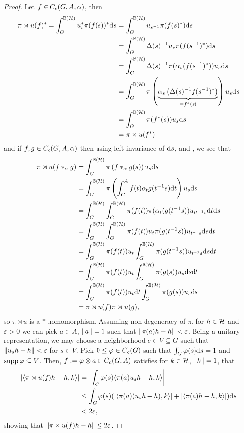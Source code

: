 \begin{proof}
Let $f \in C_c(G,A,\alpha)$, then
\begin{align*}
	\pi \rtimes u(f)^* = \int_G^{\mathbb{B}(\mathcal{H})}  u_s^* \pi(f(s))^* \mathrm{d} s &= \int_G^{\mathbb{B}(\mathcal{H})} u_{s^{-1}} \pi(f(s)^*) \mathrm{d} s\\
	&= \int_G^{\mathbb{B}(\mathcal{H})} \Delta(s)^{-1} u_{s} \pi(f(s^{-1})^*) \mathrm{d} s \\
	&= \int_G^{\mathbb{B}(\mathcal{H})} \Delta(s)^{-1} \pi(\alpha_s(f(s^{-1})^*)) u_s \mathrm{d} s\\
	&= \int_G^{\mathbb{B}(\mathcal{H})} \pi\left( \underbrace{\alpha_s\left( \Delta(s)^{-1}f(s^{-1})^* \right)}_{=f^*(s)} \right) u_s \mathrm{d} s\\
	&= \int_G^{\mathbb{B}(\mathcal{H})} \pi(f^*(s)) u_s \mathrm{d} s\\
	&= \pi \rtimes u(f^*)
\end{align*}
and if $f,g \in C_c(G,A,\alpha)$ then using left-invariance of $\mathrm{d} s$,  and , we see that
\begin{align*}
	\pi \rtimes u(f\ast_{\alpha}g) &= \int_G^{\mathbb{B}(\mathcal{H})} \pi \left( f \ast_\alpha g(s) \right)u_s \mathrm{d} s\\
	&= \int_G^{\mathbb{B}(\mathcal{H})} \pi\left( \int_G^A f(t) \alpha_t g(t^{-1}s) \mathrm{d} t \right)u_s \mathrm{d} s\\
	&= \int_G^{\mathbb{B}(\mathcal{H})}\int_G^{\mathbb{B}(\mathcal{H})} \pi(f(t)) \pi(\alpha_t(g(t^{-1}s))u_{t t^{-1}s} \mathrm{d} t \mathrm{d} s\\
	&= \int_G^{\mathbb{B}(\mathcal{H})} \int_G ^{\mathbb{B}(\mathcal{H})} \pi(f(t)) u_t \pi(g(t^{-1}s)) u_{t^{-1}s}\mathrm{d} s \mathrm{d} t\\
	&= \int_G^{\mathbb{B}(\mathcal{H})} \pi(f(t)) u_t \int_G^{\mathbb{B}(\mathcal{H})} \pi(g(t^{-1}s )) u_{t^{-1}s} \mathrm{d} s \mathrm{d} t\\
	&= \int_G ^{\mathbb{B}(\mathcal{H})} \pi(f(t)) u_t \int_G ^{\mathbb{B}(\mathcal{H})} \pi(g(s)) u_s \mathrm{d} s \mathrm{d} t\\
	&= \int_G ^{\mathbb{B}(\mathcal{H})} \pi(f(t)) u_t \mathrm{d} t \int_G ^{\mathbb{B}(\mathcal{H})} \pi(g(s)) u_s \mathrm{d} s \\
	&= \pi \rtimes u (f) \pi\rtimes u (g),
\end{align*}
so $\pi \rtimes u$ is a $*$-homomorphism. Assuming non-degeneracy of $\pi$, for $h \in \mathcal{H}$ and $\varepsilon>0$ we can pick $a \in A$, $\left\lVert a \right\rVert =1$ such that $\left\lVert \pi(a) h - h \right\rVert < \varepsilon$. Being a unitary representation, we may choose a neighborhood $e \in V \subseteq G$ such that $\left\lVert u_s h - h\right\rVert < \varepsilon$ for $s \in V$. Pick $0 \leq \varphi \in C_c(G)$ such that $\int_G \varphi(s) \mathrm{d} s = 1$ and $\operatorname{supp} \varphi \subseteq V$. Then, $f := \varphi \otimes a \in C_c(G,A)$ satisfies for $k \in \mathcal{H}$, $\left\lVert k \right\rVert = 1$, that
\begin{align*}
\left| \langle \pi \rtimes u(f)h-h,k\rangle \right| &= 	\left| \int_G \varphi(s) \langle \pi(a)u_s h-h,k \rangle\right|\\
& \leq \int_G \varphi(s) (|\langle \pi(a) (u_s h-h),k\rangle|+|\langle \pi(a)h-h,k\rangle| ) \mathrm{d} s \\
&< 2 \varepsilon,
\end{align*}
showing that $\left\lVert \pi \rtimes u(f)h-h\right\rVert \leq 2 \varepsilon$.
\end{proof}

